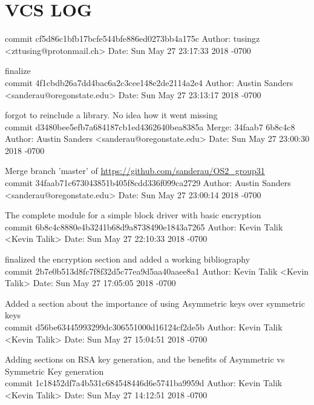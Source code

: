 \documentclass[onecolumn, draftclsnofoot,10pt, compsoc]{IEEEtran}
\begin{document}
    \section{VCS LOG}
    {\obeylines %
    commit cf5d86c1bfb17bcfe544bfe886ed0273bb4a175c
Author: tusingz <zttusing@protonmail.ch>
Date:   Sun May 27 23:17:33 2018 -0700

    finalize\\

commit 4f1cbdb26a7dd4bac6a2c3cee148e2de2114a2e4
Author: Austin Sanders <sanderau@oregonstate.edu>
Date:   Sun May 27 23:13:17 2018 -0700

    forgot to reinclude a library. No idea how it went missing\\

commit d3480bee5efb7a684187cb1ed4362640bea8385a
Merge: 34faab7 6b8c4c8
Author: Austin Sanders <sanderau@oregonstate.edu>
Date:   Sun May 27 23:00:30 2018 -0700

    Merge branch 'master' of \url{https://github.com/sanderau/OS2_group31}\\

commit 34faab71c673043851b405f8cdd336f099ca2729
Author: Austin Sanders <sanderau@oregonstate.edu>
Date:   Sun May 27 23:00:14 2018 -0700

    The complete module for a simple block driver with basic encryption\\

commit 6b8c4c8880e4b3241b68d9a8738490e1843a7265
Author: Kevin Talik <Kevin Talik>
Date:   Sun May 27 22:10:33 2018 -0700

    finalized the encryption section and added a working bibliography\\

commit 2b7e0b513d8fc7f8f32d5c77ea9d5aa40aaee8a1
Author: Kevin Talik <Kevin Talik>
Date:   Sun May 27 17:05:05 2018 -0700

    Added a section about the importance of using Asymmetric keys over symmetric keys\\

commit d56be63445993299dc306551000d16124cf2de5b
Author: Kevin Talik <Kevin Talik>
Date:   Sun May 27 15:04:51 2018 -0700

    Adding sections on RSA key generation, and the benefits of Asymmetric vs Symmetric Key generation\\

commit 1c18452df7a4b531c684548446d6e5741ba9959d
Author: Kevin Talik <Kevin Talik>
Date:   Sun May 27 14:12:51 2018 -0700

}
\end{document}
